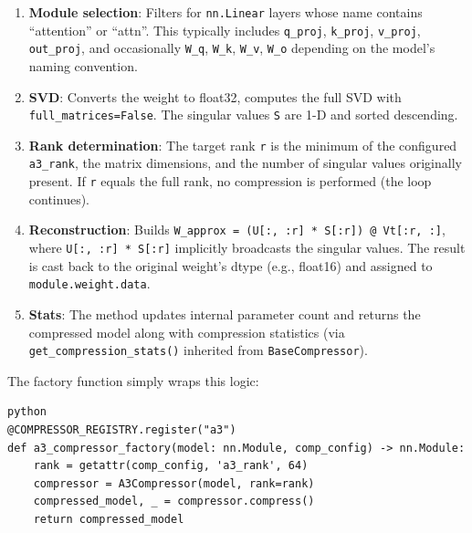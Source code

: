 \begin{enumerate}
\item \textbf{Module selection}: Filters for \texttt{nn.Linear} layers whose name contains ``attention'' or ``attn''. This typically includes \texttt{q\_proj}, \texttt{k\_proj}, \texttt{v\_proj}, \texttt{out\_proj}, and occasionally \texttt{W\_q}, \texttt{W\_k}, \texttt{W\_v}, \texttt{W\_o} depending on the model's naming convention.

\item \textbf{SVD}: Converts the weight to float32, computes the full SVD with \texttt{full\_matrices=False}. The singular values \texttt{S} are 1-D and sorted descending.

\item \textbf{Rank determination}: The target rank \texttt{r} is the minimum of the configured \texttt{a3\_rank}, the matrix dimensions, and the number of singular values originally present. If \texttt{r} equals the full rank, no compression is performed (the loop continues).

\item \textbf{Reconstruction}: Builds \texttt{W\_approx = (U[:, :r] * S[:r]) @ Vt[:r, :]}, where \texttt{U[:, :r] * S[:r]} implicitly broadcasts the singular values. The result is cast back to the original weight's dtype (e.g., float16) and assigned to \texttt{module.weight.data}.

\item \textbf{Stats}: The method updates internal parameter count and returns the compressed model along with compression statistics (via \texttt{get\_compression\_stats()} inherited from \texttt{BaseCompressor}).

\end{enumerate}
The factory function simply wraps this logic:

\vspace{0.5em}
\begin{mdframed}[backgroundcolor=codebg, linecolor=codeframe, linewidth=1pt, roundcorner=4pt, innerleftmargin=2pt, innerrightmargin=5pt, innertopmargin=5pt, innerbottommargin=5pt]
\begin{lstlisting}
python
@COMPRESSOR_REGISTRY.register("a3")
def a3_compressor_factory(model: nn.Module, comp_config) -> nn.Module:
    rank = getattr(comp_config, 'a3_rank', 64)
    compressor = A3Compressor(model, rank=rank)
    compressed_model, _ = compressor.compress()
    return compressed_model
\end{lstlisting}
\end{mdframed}
\vspace{0.5em}

